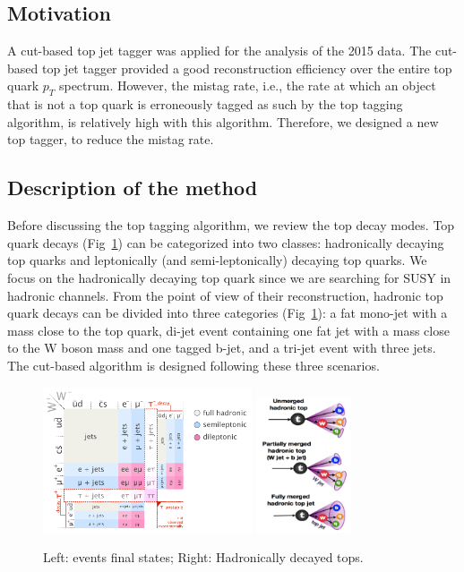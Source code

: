 \subsection{Motivation}
A cut-based top jet tagger was applied for the analysis of the 2015 data\cite{CMS-PAS-SUS-16-030}. The cut-based top jet tagger provided a good reconstruction efficiency over the entire top quark $p_{T}$ spectrum. However, the mistag rate, i.e., the rate at which an object that is not a top quark is erroneously tagged as such by the top tagging algorithm, is relatively high with this algorithm. Therefore, we designed a new top tagger, to reduce the mistag rate. 

\subsection{Description of the method}
\label{sec:toptagger}

Before discussing the top tagging algorithm, we review the top decay modes. Top quark decays (Fig~\ref{fig:c4twdecaymod}) can be categorized into two classes: hadronically decaying top quarks and leptonically (and semi-leptonically) decaying top quarks. We focus on the hadronically decaying top quark since we are searching for SUSY in hadronic channels. From the point of view of their reconstruction, hadronic top quark decays can be divided into three categories (Fig~\ref{fig:c4twdecaymod}): a fat mono-jet with a mass close to the top quark, di-jet event containing one fat jet with a mass close to the W boson mass and one tagged b-jet, and a tri-jet event with three jets. The cut-based algorithm is designed following these three scenarios. 

\begin{figure}[htbp]
 \begin{center}
  \includegraphics[width=0.55\textwidth]{figures/c4/c4_top_w_decaymod.png}
  \includegraphics[width=0.25\textwidth]{figures/c4/c4_tagger_hadtopdecay.png}
 \end{center}
 \caption{Left: \ttbar events final states; Right: Hadronically decayed tops.}
 \label{fig:c4twdecaymod}
\end{figure}


